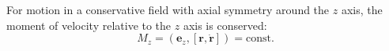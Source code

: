 For motion in a conservative field with axial symmetry around the $z$ axis, the moment of velocity relative to the $z$ axis is conserved:
$$M_z = (\mathbf{e}_z, [\mathbf{r}, \dot{\mathbf{r}}]) = \text{const}.$$
